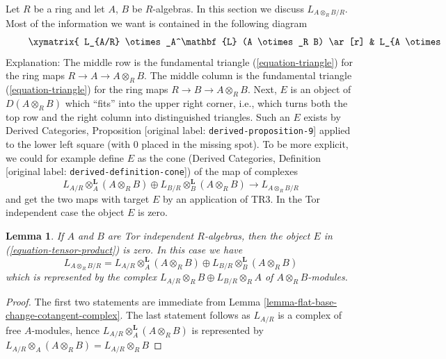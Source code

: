 \documentclass[10pt,a4paper]{article}
\theoremstyle{plain}
\newtheorem{lemma}[subsection]{Lemma}
\theoremstyle{definition}
\theoremstyle{remark}
\numberwithin{equation}{subsection}
\begin{document}
\noindent
Let $R$ be a ring and let $A$, $B$ be $R$-algebras. In this section we
discuss $L_{A \otimes_R B/R}$. Most of the information we want is contained
in the following diagram
\begin{equation}
\label{equation-tensor-product}
\vcenter{
\xymatrix{
L_{A/R} \otimes_A^\mathbf{L} (A \otimes_R B) \ar[r] &
L_{A \otimes_R B/B} \ar[r] &
E \\
L_{A/R} \otimes_A^\mathbf{L} (A \otimes_R B) \ar[r] \ar@{=}[u] &
L_{A \otimes_R B/R} \ar[r] \ar[u] &
L_{A \otimes_R B/A} \ar[u] \\
 &
L_{B/R} \otimes_B^\mathbf{L} (A \otimes_R B) \ar[u] \ar@{=}[r] &
L_{B/R} \otimes_B^\mathbf{L} (A \otimes_R B) \ar[u]
}
}
\end{equation}
Explanation: The middle row is the fundamental triangle
(\ref{equation-triangle}) for the ring maps $R \to A \to A \otimes_R B$.
The middle column is the fundamental triangle
(\ref{equation-triangle}) for the ring maps $R \to B \to A \otimes_R B$.
Next, $E$ is an object of $D(A \otimes_R B)$ which ``fits'' into the
upper right corner, i.e., which turns both the top row
and the right column into distinguished triangles. Such an $E$
exists by Derived Categories, Proposition \textnormal{[original label: \nolinkurl{derived-proposition-9}]}
applied to the lower left square (with $0$ placed in the missing
spot). To be more explicit, we could for example define $E$ as the cone
(Derived Categories, Definition \textnormal{[original label: \nolinkurl{derived-definition-cone}]})
of the map of complexes
$$
L_{A/R} \otimes_A^\mathbf{L} (A \otimes_R B) \oplus
L_{B/R} \otimes_B^\mathbf{L} (A \otimes_R B)
\longrightarrow
L_{A \otimes_R B/R}
$$
and get the two maps with target $E$ by an application of TR3.
In the Tor independent case the object $E$ is zero.

\begin{lemma}
\label{lemma-tensor-product-tor-independent}
If $A$ and $B$ are Tor independent $R$-algebras, then the object $E$
in (\ref{equation-tensor-product}) is zero. In this case we have
$$
L_{A \otimes_R B/R} =
L_{A/R} \otimes_A^\mathbf{L} (A \otimes_R B) \oplus
L_{B/R} \otimes_B^\mathbf{L} (A \otimes_R B)
$$
which is represented by the complex
$L_{A/R} \otimes_R B \oplus L_{B/R} \otimes_R A $
of $A \otimes_R B$-modules.
\end{lemma}

\begin{proof}
The first two statements are immediate from
Lemma \ref{lemma-flat-base-change-cotangent-complex}.
The last statement follows as $L_{A/R}$ is a complex
of free $A$-modules, hence $L_{A/R} \otimes_A^\mathbf{L} (A \otimes_R B)$
is represented by
$L_{A/R} \otimes_A (A \otimes_R B) = L_{A/R} \otimes_R B$
\end{proof}
\end{document}
